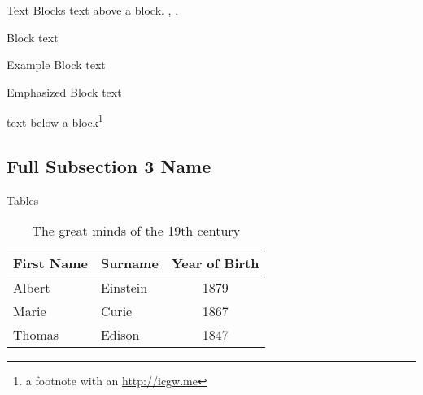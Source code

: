 \documentclass[]{beamer}
\begin{document}
\begin{frame}{Text Blocks}
	text above a block. , .
	\begin{block}{Block}
		text
	\end{block}
	\begin{exampleblock}{Example Block}
		text
	\end{exampleblock}
	\begin{alertblock}{Emphasized Block}
		text
	\end{alertblock}
	text below a block\footnote{a footnote with an \url{http://icgw.me}}
\end{frame}


\subsection[Short Subsection 3 Name]{Full Subsection 3 Name}

\begin{frame}{Tables}
	\begin{table}
		\begin{tabular}{llc}
			First Name & Surname  & Year of Birth \\ \midrule
			Albert     & Einstein & 1879          \\
			Marie      & Curie    & 1867          \\
			Thomas     & Edison   & 1847          \\
		\end{tabular}
		\caption{The great minds of the 19th century}
	\end{table}
\end{frame}
\end{document}
